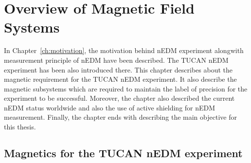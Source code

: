 \chapter{Overview of Magnetic Field Systems}\label{ch:magnetics}



In Chapter~\ref{ch:motivation}, the motivation behind nEDM experiment alongwith measurement principle of nEDM have been described. The TUCAN nEDM experiment has been also introduced there. This chapter describes about the magnetic requirement for the TUCAN nEDM experiment. It also describe the magnetic subsystems which are required to maintain the label of precision for the experiment to be successful. Moreover, the chapter also described the current nEDM status worldwide and also the use of active shielding for nEDM measurement. Finally, the chapter ends with  describing the main objective for this thesis. 


\section{Magnetics for the TUCAN nEDM experiment}\label{sec:msr}





